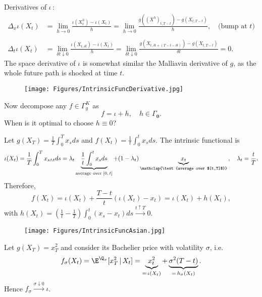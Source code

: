 
Derivatives of $\iota\,$:
\begin{align*}
    \Delta_x \iota(X_t) &= \lim_{h \to 0} \frac{ \iota(X^h_t)- \iota(X_t)}{h}
    = \lim_{h \to 0} \frac{g((X^h)_{t,T-t})- g(X_{t,T-t})}{h}, \quad \text{(bump at $t$)}\\\\
    \Delta_t \iota(X_t) &= \lim_{\delta t \downarrow 0} \frac{ \iota(X_{t,\delta t})- \iota(X_t)}{h}
    = \lim_{\delta t \downarrow 0} \frac{g(X_{t,\delta t + (T-t - \delta t)})- g(X_{t,T-t})}{\delta t} = 0.
\end{align*}
The space derivative of $\iota$ is somewhat similar the Malliavin derivative of $g$, as the whole future path is shocked at time $t$.

\begin{figure}[H]
    \centering
    \texttt{[image: Figures/IntrinsicFuncDerivative.jpg]}
\end{figure}
Now decompose any $f\in \Gamma_g^K$ as
$$f = \iota + h, \quad h\in \Gamma_{\boldsymbol{0}}.$$
When is it optimal to choose $h \equiv 0$?

\begin{example}
Let $g(X_T)=\frac{1}{T}\int_0^T x_s ds$ and $f(X_t) = \frac{1}{t}\int_0^t x_s ds$. The intrinsic functional is 
$$\iota(X_t)  =\frac{1}{T}\int_0^T x_{s\wedge t} ds  = \lambda_t \underbrace{\frac{1}{t}\int_0^t x_s ds}_{\text{average over $[0,t]$}} + (1-\lambda_t)\underbrace{x_t}_{\mathclap{\text{average over $[t,T]$}}}\,, \quad \lambda_t = \frac{t}{T}.$$
 Therefore, 
$$f(X_t) = \iota(X_t) + \frac{T-t}{t}(\iota(X_t)-x_t) = \iota(X_t) +  h(X_t), $$
with $h(X_t) = \left(\frac{1}{t} - \frac{1}{T}\right) \int_0^t (x_s-x_t) ds \overset{t\uparrow T}{\longrightarrow} 0$.

\begin{figure}[H]
    \centering
    \texttt{[image: Figures/IntrinsicFuncAsian.jpg]}
\end{figure}

\end{example}

\begin{example}
Let $g(X_T)=x^2_T$ and consider its Bachelier price with volatility $\sigma$, i.e. 
$$f_{\sigma}(X_t) = \E^{\Q_{\sigma}}[ x_T^2\, | \, X_t] = \underbrace{x_t^2}_{= \, \iota(X_t)} + \underbrace{\sigma^2(T-t)}_{=\,h_{\sigma}(X_t)}.$$
Hence $f_{\sigma} \overset{\sigma \downarrow 0}{\longrightarrow} \iota$. 
\end{example}

